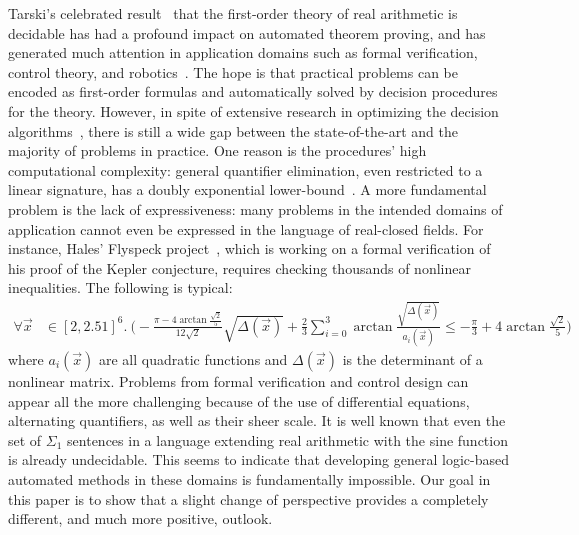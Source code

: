 \documentclass[prodmode]{acmsmall} %
\begin{document}
Tarski's celebrated result~\cite{tarski} that the first-order theory of real arithmetic is decidable has had a profound impact on automated theorem proving, and has generated much attention in application domains such as formal verification, control theory, and robotics~\cite{qeappl}. The hope is that practical problems can be encoded as first-order formulas and automatically solved by decision procedures for the theory. However, in spite of extensive research in optimizing the decision algorithms~\cite{collins}, there is still a wide gap between the state-of-the-art and the majority of problems in practice. One reason is the procedures' high computational complexity: general quantifier elimination, even restricted to a linear signature, has a doubly exponential lower-bound~\cite{BrownD07}. A more fundamental problem is the lack of expressiveness: many problems in the intended domains of application cannot even be expressed in the language of real-closed fields. For instance, Hales' Flyspeck project~\cite{DBLP:conf/dagstuhl/Hales05,DBLP:journals/dcg/HalesHMNOZ10}, which is working on a formal verification of his proof of the Kepler conjecture, requires checking thousands of nonlinear inequalities. The following is typical:
\begin{align*}
\forall \vec x&\in [2, 2.51]^6.\ \Big( -\frac{\pi-4\arctan\frac{\sqrt 2}{5}}{12\sqrt2}\sqrt{\Delta(\vec x)}+\frac{2}{3}\sum_{i=0}^3\arctan\frac{\sqrt{\Delta(\vec x)}}{a_i(\vec x)}\leq -\frac{\pi}{3}+4\arctan\frac{\sqrt 2}{5}\Big)
\end{align*}
where $a_i(\vec x)$ are all quadratic functions and $\Delta(\vec x)$ is the determinant of a nonlinear matrix. Problems from formal verification and control design can appear all the more challenging because of the use of differential equations, alternating quantifiers, as well as their sheer scale. It is well known that even the set of $\Sigma_1$ sentences in a language extending real arithmetic with the sine function is already undecidable. This seems to indicate that developing general logic-based automated methods in these domains is fundamentally impossible. Our goal in this paper is to show that a slight change of perspective provides a completely different, and much more positive, outlook.
\end{document}
